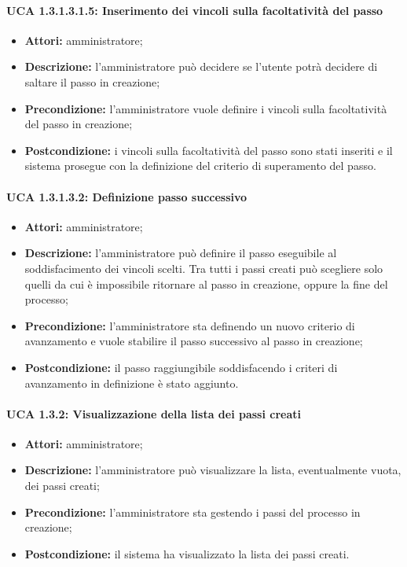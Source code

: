 \paragraph{UCA 1.3.1.3.1.5: Inserimento dei vincoli sulla facoltatività del passo}
\begin{itemize}
\item \textbf{Attori:} 
amministratore;
\item \textbf{Descrizione:} 
l'amministratore può decidere se l'utente potrà decidere di saltare il passo in creazione;
\item \textbf{Precondizione:} 
l'amministratore vuole definire i vincoli sulla facoltatività del passo in creazione;
\item \textbf{Postcondizione:}
i vincoli sulla facoltatività del passo sono stati inseriti e il sistema prosegue con la definizione del criterio di superamento del passo.
\end{itemize}

\paragraph{UCA 1.3.1.3.2: Definizione passo successivo}
\begin{itemize}
\item \textbf{Attori:} 
amministratore;
\item \textbf{Descrizione:}
l'amministratore può definire il passo eseguibile al soddisfacimento dei vincoli scelti. Tra tutti i passi creati può scegliere solo quelli da cui è impossibile ritornare al passo in creazione, oppure la fine del processo;
\item \textbf{Precondizione:} 
l'amministratore sta definendo un nuovo criterio di avanzamento e vuole stabilire il passo successivo al passo in creazione;
\item \textbf{Postcondizione:}
il passo raggiungibile soddisfacendo i criteri di avanzamento in definizione è stato aggiunto.
\end{itemize}

\paragraph{UCA 1.3.2: Visualizzazione della lista dei passi creati}
\begin{itemize}
\item \textbf{Attori:} 
amministratore;
\item \textbf{Descrizione:}
l'amministratore può visualizzare la lista, eventualmente vuota, dei passi creati;
\item \textbf{Precondizione:} 
l'amministratore sta gestendo i passi del processo in creazione;
\item \textbf{Postcondizione:}
il sistema ha visualizzato la lista dei passi creati.
\end{itemize}

